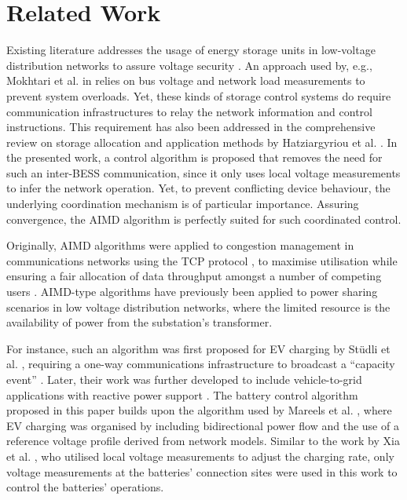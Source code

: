 \section{Related Work}
\label{ch4:sec:related-work}

Existing literature addresses the usage of energy storage units in low-voltage distribution networks to assure voltage security \cite{Sugihara2013, Toledo2013, Marra2013, Mokhtari2013, Atia2016}. An approach used by, e.g., Mokhtari et al. in \cite{Mokhtari2013} relies on bus voltage and network load measurements to prevent system overloads. Yet, these kinds of storage control systems do require communication infrastructures to relay the network information and control instructions. This requirement has also been addressed in the comprehensive review on storage allocation and application methods by Hatziargyriou et al. \cite{Hatziargyriou2015}. In the presented work, a control algorithm is proposed that removes the need for such an inter-BESS communication, since it only uses local voltage measurements to infer the network operation. Yet, to prevent conflicting device behaviour, the underlying coordination mechanism is of particular importance. Assuring convergence, the AIMD algorithm is perfectly suited for such coordinated control.

Originally, AIMD algorithms were applied to congestion management in communications networks using the TCP protocol \cite{Chiu1989}, to maximise utilisation while ensuring a fair allocation of data throughput amongst a number of competing users \cite{Wirth2014}. AIMD-type algorithms have previously been applied to power sharing scenarios in low voltage distribution networks, where the limited resource is the availability of power from the substation's transformer.

For instance, such an algorithm was first proposed for EV charging by St{\"{u}}dli et al. \cite{Studli2012}, requiring a one-way communications infrastructure to broadcast a ``capacity event'' \cite{Studli2014, Studli2014a}. Later, their work was further developed to include vehicle-to-grid applications with reactive power support \cite {Studli2015}. The battery control algorithm proposed in this paper builds upon the algorithm used by Mareels et al. \cite{Mareels2014}, where EV charging was organised by including bidirectional power flow and the use of a reference voltage profile derived from network models. Similar to the work by Xia et al. \cite{Xia2014}, who utilised local voltage measurements to adjust the charging rate, only voltage measurements at the batteries' connection sites were used in this work to control the batteries' operations.

